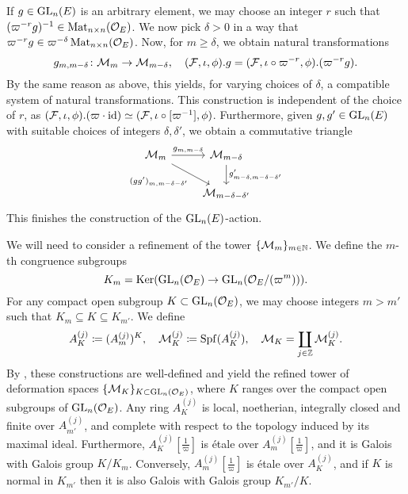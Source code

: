 \documentclass[../main.tex]{subfiles}
\begin{document}
If $g \in \operatorname{GL}_n(E)$ is an arbitrary element, we may choose an integer $r$ such
that $(\varpi^{-r} g)^{-1} \in \operatorname{Mat}_{n \times n}(\mathcal{O}_E)$. We now pick 
$\delta > 0$ in a way that $\varpi^{-r}g \in \varpi^{-\delta}\operatorname{Mat}_{n \times n}(\mathcal{O}_E)$. 
Now, for $m \geq \delta$, we obtain natural transformations
\begin{equation*}
  g_{m,m-\delta}\colon \mathcal{M}_{m} \to \mathcal{M}_{m-\delta}, \quad (\mathcal{F}, \iota, \phi).g = (\mathcal{F}, \iota \circ \varpi^{-r}, \phi).(\varpi^{-r}g).
\end{equation*}
By the same reason as above, this yields, for varying choices of $\delta$, a
compatible system of natural transformations.
This construction is independent of the choice of $r$, as $(\mathcal{F}, \iota,
\phi).(\varpi\cdot\operatorname{id}) \simeq (\mathcal{F}, \iota \circ [\varpi^{-1}], \phi)$.
Furthermore, given $g, g' \in \operatorname{GL}_n(E)$ with suitable choices of integers 
$\delta, \delta'$, we obtain a commutative triangle
\begin{equation*}
\begin{tikzcd}[ampersand replacement=\&]
	{\cM_{m}} \& {\cM_{m-\delta}} \\
	\& {\cM_{m-\delta-\delta'}}
	\arrow["{g_{m,m-\delta}}", from=1-1, to=1-2]
	\arrow["{(gg')_{m,m-\delta-\delta'}}"', from=1-1, to=2-2]
	\arrow["{g'_{m-\delta,m-\delta-\delta'}}", from=1-2, to=2-2]
\end{tikzcd}
\end{equation*}
This finishes the construction of the $\operatorname{GL}_n(E)$-action.

We will need to consider a refinement of the tower $\{\mathcal{M}_m\}_{m \in \mathbb{N}}$. We
define the 
$m$-th congruence subgroups
\begin{equation}\label{eq:defCongruenceSubgroup}
  K_m = \operatorname{Ker}(\operatorname{GL}_n(\mathcal{O}_E) \to \operatorname{GL}_n(\mathcal{O}_E/(\varpi^m))).
\end{equation}
For any compact open subgroup $K \subset \operatorname{GL}_n(\mathcal{O}_E)$, we may choose integers
$m > m'$ such that $K_m \subseteq K \subseteq K_{m'}$. We define 
\begin{equation*}
  A_K^{(j)} \coloneq (A^{(j)}_m)^K, \quad \mathcal{M}_K^{(j)} \coloneq \operatorname{Spf}(A_K^{(j)}), \quad
  \mathcal{M}_K = \coprod_{j \in \mathbb{Z}} \mathcal{M}_K^{(j)}.
\end{equation*}
By \cite[Proposition 2.2.5]{Strauch2008DefSp}, these constructions are well-defined
and yield the refined tower of deformation spaces 
$\{\mathcal{M}_K\}_{K \subset \operatorname{GL}_n(\mathcal{O}_E)}$, where $K$ ranges over 
the compact open subgroups of $\operatorname{GL}_n(\mathcal{O}_E)$. Any ring
$A_K^{(j)}$ is local, noetherian, integrally closed and finite over
$A_{m'}^{(j)}$, and complete with respect to the topology induced by its maximal ideal.
Furthermore,
$A_{K}^{(j)}[\tfrac 1 \varpi]$ is \'etale over $A_{m}^{(j)}[\tfrac 1 \varpi]$, 
and it is Galois with Galois group $K/K_m$. Conversely, $A_{m}^{(j)}[\tfrac 1 \varpi]$
is \'etale over $A_K^{(j)}$, and if $K$ is normal in $K_{m'}$ then it is also
Galois with Galois group $K_{m'}/K$. 
\end{document}
